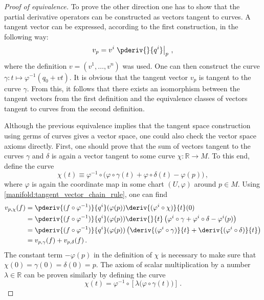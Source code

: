 {\begin{mdframed}[roundcorner=10pt, linecolor=blue, linewidth=1pt]
\begin{proof}[Proof of equivalence]
                To prove the other direction one has to show that the partial derivative operators can be constructed as vectors tangent to curves. A tangent vector can be expressed, according to the first construction, in the following way: \[v_p = v^i\left.\pderiv{}{q^i}\right|_p\,,\] where the definition $v = (v^1,\ldots,v^n)$ was used. One can then construct the curve $\gamma:t\mapsto\varphi^{-1}(q_0+vt)$. It is obvious that the tangent vector $v_p$ is tangent to the curve $\gamma$. From this, it follows that there exists an isomorphism between the tangent vectors from the first definition and the equivalence classes of vectors tangent to curves from the second definition.

                Although the previous equivalence implies that the tangent space construction using germs of curves gives a vector space, one could also check the vector space axioms directly. First, one should prove that the sum of vectors tangent to the curves $\gamma$ and $\delta$ is again a vector tangent to some curve $\chi:\mathbb{R}\rightarrow M$. To this end, define the curve \[\chi(t)\equiv\varphi^{-1}\circ\bigl(\varphi\circ\gamma(t) + \varphi\circ\delta(t) - \varphi(p)\bigr)\,,\] where $\varphi$ is again the coordinate map in some chart $(U,\varphi)$ around $p\in M$. Using \cref{manifold:tangent_vector_chain_rule}, one can find
                \begin{align*}
                    v_{p,\chi}(f) &= \pderiv{(f\circ\varphi^{-1})}{q^i}(\varphi(p))\deriv{(\varphi^i\circ\chi)}{t}(0)\\
                    &=\pderiv{(f\circ\varphi^{-1})}{q^i}(\varphi(p))\deriv{}{t}\left(\varphi^i\circ\gamma + \varphi^i\circ\delta - \varphi^i(p)\right)\\
                    &=\pderiv{(f\circ\varphi^{-1})}{q^i}(\varphi(p))\left(\deriv{(\varphi^i\circ\gamma)}{t} + \deriv{(\varphi^i\circ\delta)}{t}\right)\\
                    &=v_{p,\gamma}(f) + v_{p,\delta}(f)\,.
                \end{align*}
                The constant term $-\varphi(p)$ in the definition of $\chi$ is necessary to make sure that $\chi(0) = \gamma(0) = \delta(0) = p$. The axiom of scalar multiplication by a number $\lambda\in\mathbb{R}$ can be proven similarly by defining the curve \[\chi(t) = \varphi^{-1}\circ\left[\lambda\bigl(\varphi\circ\gamma(t)\bigr)\right]\,.\]
            \end{proof}
        \end{mdframed}
    }

